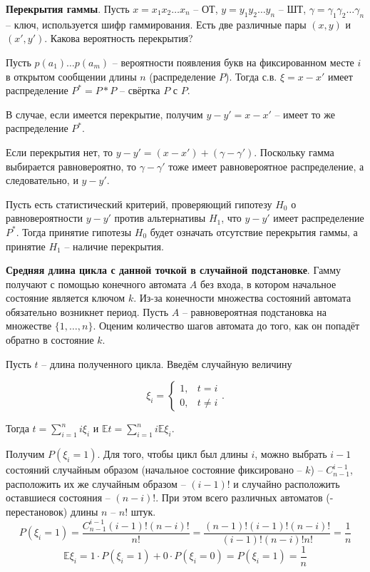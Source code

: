 \textbf{Перекрытия гаммы}. Пусть $x = x_1 x_2 \ldots x_n$ -- ОТ, $y = y_1 y_2 \ldots y_n$ -- ШТ, $\gamma = \gamma_1 \gamma_2 \ldots \gamma_n$ -- ключ, используется шифр гаммирования. Есть две различные пары $(x, y)$ и $(x', y')$. Какова вероятность перекрытия?

Пусть $p(a_1) \ldots p(a_m)$ -- вероятности появления букв на фиксированном месте $i$ в открытом сообщении длины $n$ (распределение $P$). Тогда с.в. $\xi = x - x'$ имеет распределение $P^* = P*P$ -- свёртка $P$ с $P$.

В случае, если имеется перекрытие, получим $y - y' = x - x'$ -- имеет то же распределение $P^*$.

Если перекрытия нет, то $y-y' = (x - x') + (\gamma - \gamma')$. Поскольку гамма выбирается равновероятно, то $\gamma-\gamma'$ тоже имеет равновероятное распределение, а следовательно, и $y-y'$.

Пусть есть статистический критерий, проверяющий гипотезу $H_0$ о равновероятности $y-y'$ против альтернативы $H_1$, что $y-y'$ имеет распределение $P^*$. Тогда принятие гипотезы $H_0$ будет означать отсутствие перекрытия гаммы, а принятие $H_1$ -- наличие перекрытия.

\textbf{Средняя длина цикла с данной точкой в случайной подстановке}. Гамму получают с помощью конечного автомата $A$ без входа, в котором начальное состояние является ключом $k$. Из-за конечности множества состояний автомата обязательно возникнет период. Пусть $A$ -- равновероятная подстановка на множестве $\{1, \ldots , n\}$. Оценим количество шагов автомата до того, как он попадёт обратно в состояние $k$.

Пусть $t$ -- длина полученного цикла. Введём случайную величину

$$\xi_i = 
\begin{cases}
1, & t = i\\
0, & t \ne i
\end{cases}.
$$

Тогда $t = \sum_{i=1}^n i \xi_i$ и $\mathbb E t = \sum_{i=1}^n i \mathbb E \xi_i$.

Получим $P(\xi_i = 1)$. Для того, чтобы цикл был длины $i$, можно выбрать $i-1$ состояний случайным образом (начальное состояние фиксировано -- $k$) -- $C_{n-1}^{i-1}$, расположить их же случайным образом -- $(i-1)!$ и случайно расположить оставшиеся состояния -- $(n-i)!$. При этом всего различных автоматов (-перестановок) длины $n$  -- $n!$ штук.
$$P(\xi_i = 1) = \frac{C_{n-1}^{i-1} (i-1)! (n-i)!}{n!} = \frac{(n-1)! (i-1)! (n-i)!}{(i-1)! (n-i)! n!} = \frac{1}{n}$$
$$\mathbb E \xi_i = 1 \cdot P(\xi_i = 1) + 0 \cdot P(\xi_i = 0) = P(\xi_i = 1) = \frac{1}{n}$$


